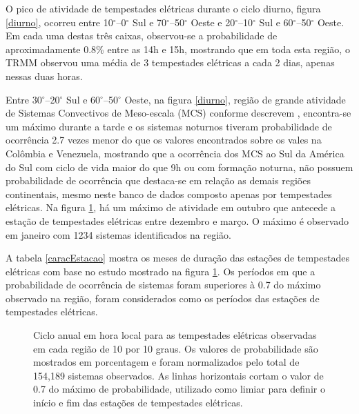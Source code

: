 O pico de atividade de tempestades elétricas durante o ciclo diurno, figura \ref{diurno}, ocorreu entre 10$^{\circ}$--0$^{\circ}$ Sul e 70$^{\circ}$--50$^{\circ}$ Oeste e 20$^{\circ}$--10$^{\circ}$ Sul e 60$^{\circ}$--50$^{\circ}$ Oeste. Em cada uma destas três caixas, observou-se a probabilidade de aproximadamente 0.8\% entre as 14h e 15h, mostrando que em toda esta região, o TRMM observou uma média de 3 tempestades elétricas a cada 2 dias, apenas nessas duas horas.


Entre 30$^{\circ}$--20$^{\circ}$ Sul e 60$^{\circ}$--50$^{\circ}$ Oeste, na figura \ref{diurno}, região de grande atividade de Sistemas Convectivos de Meso-escala (MCS) conforme descrevem , encontra-se um máximo durante a tarde e os sistemas noturnos tiveram probabilidade de ocorrência 2.7 vezes menor do que os valores encontrados sobre os vales na Colômbia e Venezuela, mostrando que a ocorrência dos MCS ao Sul da América do Sul com ciclo de vida maior do que 9h ou com formação noturna, não possuem probabilidade de ocorrência que destaca-se em relação as demais regiões continentais, mesmo neste banco de dados composto apenas por tempestades elétricas. Na figura \ref{anual}, há um máximo de atividade em outubro que antecede a estação de tempestades elétricas entre dezembro e março. O máximo é observado em janeiro com 1234 sistemas identificados na região.


A tabela \ref{caracEstacao} mostra os meses de duração das estações de tempestades elétricas com base no estudo mostrado na figura \ref{anual}. Os períodos em que a probabilidade de ocorrência de sistemas foram superiores à 0.7 do máximo observado na região, foram considerados como os períodos das estações de tempestades elétricas. %


\begin{figure}[!ht]
\caption{Ciclo anual em hora local para as tempestades elétricas observadas em cada região de 10 por 10 graus. Os valores de probabilidade são mostrados em porcentagem e foram normalizados pelo total de 154,189 sistemas observados. As linhas horizontais cortam o valor de 0.7 do máximo de probabilidade, utilizado como limiar para definir o início e fim das estações de tempestades elétricas.}
\label{anual}
\end{figure}



